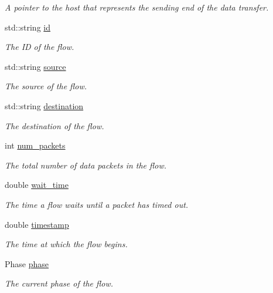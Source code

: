 \begin{DoxyCompactItemize}
\begin{DoxyCompactList}\small\item\em \-A pointer to the host that represents the sending end of the data transfer. \end{DoxyCompactList}\item 
std\-::string \hyperlink{classFlow_a8724a8f4ce94cf7bfb0db79e688ed179}{id}
\begin{DoxyCompactList}\small\item\em \-The \-I\-D of the flow. \end{DoxyCompactList}\item 
std\-::string \hyperlink{classFlow_a36eb3e23b0804647c30be41835b790b3}{source}
\begin{DoxyCompactList}\small\item\em \-The source of the flow. \end{DoxyCompactList}\item 
std\-::string \hyperlink{classFlow_a536685c38def6cf8b61d0fb0d7e8372d}{destination}
\begin{DoxyCompactList}\small\item\em \-The destination of the flow. \end{DoxyCompactList}\item 
int \hyperlink{classFlow_a35a58ba8cc58bb4ae0c94eb240f53eda}{num\-\_\-packets}
\begin{DoxyCompactList}\small\item\em \-The total number of data packets in the flow. \end{DoxyCompactList}\item 
double \hyperlink{classFlow_a6187616182361456eec5e91ff0480db6}{wait\-\_\-time}
\begin{DoxyCompactList}\small\item\em \-The time a flow waits until a packet has timed out. \end{DoxyCompactList}\item 
double \hyperlink{classFlow_a502b4455d485a1a0325d21d246183bb1}{timestamp}
\begin{DoxyCompactList}\small\item\em \-The time at which the flow begins. \end{DoxyCompactList}\item 
\-Phase \hyperlink{classFlow_a56615b49301aaddf4cab4fa3f878c5a7}{phase}
\begin{DoxyCompactList}\small\item\em \-The current phase of the flow. \end{DoxyCompactList}\item 

\end{DoxyCompactItemize}
